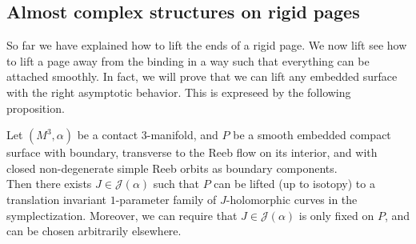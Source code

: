 \documentclass[../main.tex]{subfiles}
\begin{document}
\subsection{Almost complex structures on rigid pages}


So far we have explained how to lift the ends of a rigid page. We now lift see how to lift a page away from the binding in a way such that everything can be attached smoothly. In fact, we will prove that we can lift any embedded surface with the right asymptotic behavior. This is expreseed by the following proposition.

\begin{proposition}\label{prop:lift_stein}
\text{}
\newline
Let $(M^3,\alpha)$ be a contact $3$-manifold, and $P$ be a smooth embedded compact surface with boundary, transverse to the Reeb flow on its interior, and with closed non-degenerate simple Reeb orbits as boundary components. \\
Then there exists $J\in \mathcal{J}(\alpha)$ such that $P$ can be lifted (up to isotopy) to a translation invariant $1$-parameter family of $J$-holomorphic curves in the symplectization. Moreover, we can require that $J\in\mathcal{J}(\alpha)$ is only fixed on $P$, and can be chosen arbitrarily elsewhere.
\end{proposition}
\end{document}
